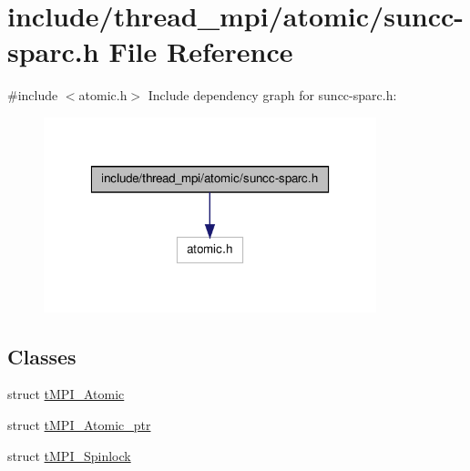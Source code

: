 \hypertarget{include_2thread__mpi_2atomic_2suncc-sparc_8h}{\section{include/thread\-\_\-mpi/atomic/suncc-\/sparc.h \-File \-Reference}
\label{include_2thread__mpi_2atomic_2suncc-sparc_8h}
}
{\ttfamily \#include $<$atomic.\-h$>$}\*
\-Include dependency graph for suncc-\/sparc.h\-:
\nopagebreak
\begin{figure}[H]
\begin{center}
\leavevmode
\includegraphics[width=274pt]{include_2thread__mpi_2atomic_2suncc-sparc_8h__incl}
\end{center}
\end{figure}
\subsection*{\-Classes}
\begin{DoxyCompactItemize}
\item 
struct \hyperlink{structtMPI__Atomic}{t\-M\-P\-I\-\_\-\-Atomic}
\item 
struct \hyperlink{structtMPI__Atomic__ptr}{t\-M\-P\-I\-\_\-\-Atomic\-\_\-ptr}
\item 
struct \hyperlink{structtMPI__Spinlock}{t\-M\-P\-I\-\_\-\-Spinlock}
\end{DoxyCompactItemize}
